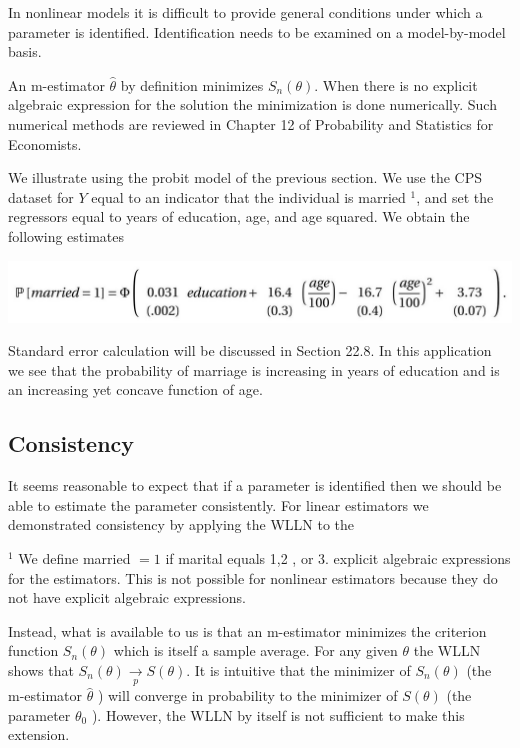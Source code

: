 \documentclass[10pt]{article}
\begin{document}
In nonlinear models it is difficult to provide general conditions under which a parameter is identified. Identification needs to be examined on a model-by-model basis.

An m-estimator $\widehat{\theta}$ by definition minimizes $S_{n}(\theta)$. When there is no explicit algebraic expression for the solution the minimization is done numerically. Such numerical methods are reviewed in Chapter 12 of Probability and Statistics for Economists.

We illustrate using the probit model of the previous section. We use the CPS dataset for $Y$ equal to an indicator that the individual is married ${ }^{1}$, and set the regressors equal to years of education, age, and age squared. We obtain the following estimates

\includegraphics[max width=\textwidth]{2022_10_23_2c4fe6dc0800a1c87de2g-02}

Standard error calculation will be discussed in Section 22.8. In this application we see that the probability of marriage is increasing in years of education and is an increasing yet concave function of age.

\subsection{Consistency}
It seems reasonable to expect that if a parameter is identified then we should be able to estimate the parameter consistently. For linear estimators we demonstrated consistency by applying the WLLN to the

${ }^{1}$ We define married $=1$ if marital equals 1,2 , or 3. explicit algebraic expressions for the estimators. This is not possible for nonlinear estimators because they do not have explicit algebraic expressions.

Instead, what is available to us is that an m-estimator minimizes the criterion function $S_{n}(\theta)$ which is itself a sample average. For any given $\theta$ the WLLN shows that $S_{n}(\theta) \underset{p}{\longrightarrow} S(\theta)$. It is intuitive that the minimizer of $S_{n}(\theta)$ (the m-estimator $\widehat{\theta}$ ) will converge in probability to the minimizer of $S(\theta)$ (the parameter $\theta_{0}$ ). However, the WLLN by itself is not sufficient to make this extension.
\end{document}
